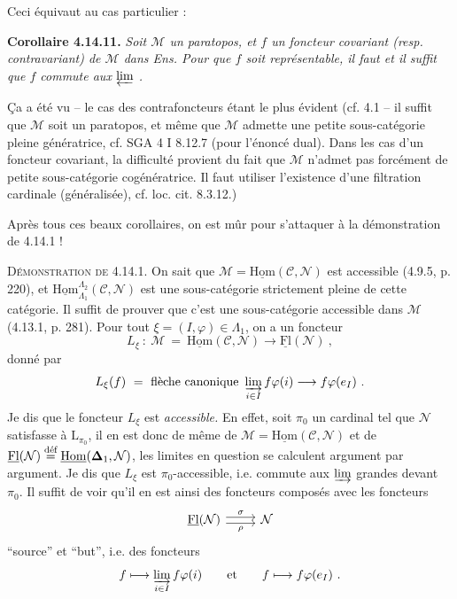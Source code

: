 \documentclass[11pt]{article}
\newcommand{\printedpage}[1]{\marginpar{\footnotesize p.~#1}}
\newcommand{\msp}[1]{\marginpar{\footnotesize [#1]}}
\newcommand{\uHom}{\underline{\mathrm{Hom}}}
\newcommand{\uFl}{\underline{\mathrm{Fl}}}
\newcommand{\defeq}{\overset{\textup{déf}}{=}}
\begin{document}
\printedpage{144}

\msp{page 380}
Ceci équivaut au cas particulier :

\textbf{Corollaire 4.14.11.} \textit{Soit $\mathcal{M}$ un paratopos, et $f$ un foncteur covariant (resp. contravariant) de $\mathcal{M}$ dans \textup{Ens}. Pour que $f$ soit représentable, il faut et il suffit que $f$ commute aux $\varprojlim$ .}

Ça a été vu -- le cas des contrafoncteurs étant le plus évident (cf. 4.1 -- il suffit que $\mathcal{M}$ soit un paratopos, et même que $\mathcal{M}$ admette une petite sous-catégorie pleine génératrice, cf. SGA 4 I 8.12.7 (pour l'énoncé dual). Dans les cas d'un foncteur covariant, la difficulté provient du fait que $\mathcal{M}$ n'admet pas forcément de petite sous-catégorie cogénératrice. Il faut utiliser l'existence d'une filtration cardinale (généralisée), cf. loc. cit. 8.3.12.) %

Après tous ces beaux corollaires, on est mûr pour s'attaquer à la démonstration de 4.14.1 !

\msp{page 381}
\textsc{Démonstration de} 4.14.1. On sait que $\mathcal{M} = \uHom(\mathcal{C},\mathcal{N})$ est accessible (4.9.5, p. 220), et $\uHom^{\Lambda_2}_{\Lambda_1}(\mathcal{C},\mathcal{N})$ est une sous-catégorie strictement pleine de cette catégorie. Il suffit de prouver que c'est une sous-catégorie accessible dans $\mathcal{M}$ (4.13.1, p. 281). Pour tout $\xi = (I,\varphi) \in \Lambda_1$, on a un foncteur
\[
L_\xi \ : \ \mathcal{M} \ = \ \uHom(\mathcal{C},\mathcal{N}) \longrightarrow \uFl(\mathcal{N}) \ ,
\]
donné par
\[
L_\xi(f) \ = \ \text{flèche canonique } \varinjlim_{i\in I} f\varphi(i) \longrightarrow f\varphi(e_I) \ .
\]
Je dis que le foncteur $L_\xi$ est \textit{accessible.} En effet, soit $\pi_0$ un cardinal tel que $\mathcal{N}$ satisfasse à $\mathrm{L}_{\pi_0}$, il en est donc de même de $\mathcal{M} = \uHom(\mathcal{C},\mathcal{N})$ et de $\uFl(\mathcal{N}) \defeq \uHom(\boldsymbol{\Delta}_1,\mathcal{N})$, les limites en question se calculent argument par argument. Je dis que $L_\xi$ est $\pi_0$-accessible, i.e. commute aux $\varinjlim$ grandes devant $\pi_0$. Il suffit de voir qu'il en est ainsi des foncteurs composés avec les foncteurs
\[
\begin{tikzcd}
\uFl(\mathcal{N}) \arrow[r, shift left, "\sigma"] \arrow[r, shift right, "\rho"'] & \mathcal{N}
\end{tikzcd}
\]
``source'' et ``but'', i.e. des foncteurs
\[
f \longmapsto \varinjlim_{i\in I} f\varphi(i) \qquad \text{et} \qquad f \longmapsto f\varphi(e_I) \ .
\]
\end{document}
